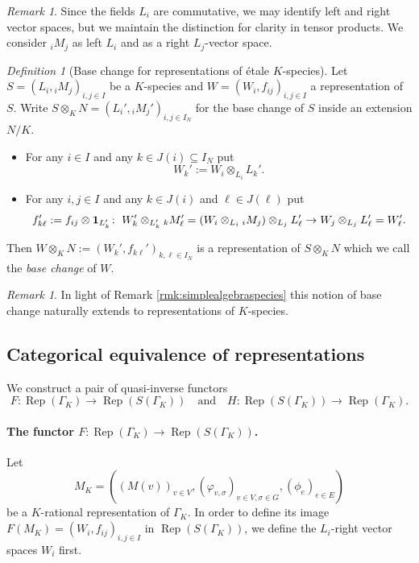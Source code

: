 \documentclass[a4paper,12pt,reqno]{amsart}
\DeclareMathOperator{\Rep}{\mathrm{Rep}}
\theoremstyle{plain}
\theoremstyle{remark}
\newtheorem{remark}[theorem]{Remark}
\newtheorem{definition}[theorem]{Definition}
\begin{document}
  \begin{remark}
      Since the fields $L_i$ are commutative, we may identify left and right vector spaces, but we maintain the distinction for clarity in tensor products. We consider ${}_iM_j$ as left $L_i$ and as a right $L_j$-vector space.
  \end{remark}

  \begin{definition}[Base change for representations of \'etale $K$-species]
    Let $S=(L_i, {}_iM_j)_{i,j\in I}$ be a $K$-species and $W=(W_i,f_{ij})_{i,j\in I}$ a representation of $S$. Write $S\otimes_K N=(L_i',{}_iM_j')_{i,j\in I_N}$ for the base change of $S$ inside an extension $N/K$.
    \begin{itemize}
    \item[(i)] For any $i\in I$ and any $k\in J(i)\subseteq I_N$ put
      \[W_k':=W_i\otimes_{L_i}L_k'.\]
    \item[(ii)] For any $i,j\in I$ and any $k\in J(i)$ and $\ell\in J(\ell)$ put
      \[
      f_{k\ell}':=f_{ij}\otimes{\bf1}_{L_k'}\colon\;
      W_k'\otimes_{L_k'}{}_kM_\ell'=
      (W_i\otimes_{L_i}{}_iM_j)\otimes_{L_j} L_\ell'\to
      W_j\otimes_{L_j} L_\ell'=W_\ell'.
      \]
    \end{itemize}
    Then $W\otimes_KN:=(W_k',f_{k\ell}')_{k,\ell\in I_N}$ is a representation of $S\otimes_K N$ which we call the {\em base change} of $W$.
  \end{definition}

  \begin{remark}
    In light of Remark \ref{rmk:simplealgebraspecies} this notion of base change naturally extends to representations of $K$-species.
  \end{remark}

  \subsection{Categorical equivalence of representations}
  
  We construct a pair of quasi-inverse functors
  \[
  F \colon \Rep(\Gamma_K) \to \Rep(S(\Gamma_K))\quad\text{and}\quad H \colon \Rep(S(\Gamma_K)) \to \Rep(\Gamma_K).
  \]

  \paragraph{The functor $F \colon \Rep(\Gamma_K) \to \Rep(S(\Gamma_K))$.}
  Let
  \[
  M_K = ((M(v))_{v\in V}, (\varphi_{v,\sigma})_{v\in V,\sigma\in G}, (\phi_e)_{e\in E})
  \]
  be a $K$-rational representation of $\Gamma_K$. In order to define its image $F(M_K) = (W_i, f_{ij})_{i,j\in I}$ in $\Rep(S(\Gamma_K))$, we define the $L_i$-right vector spaces $W_i$ first. 
\end{document}
